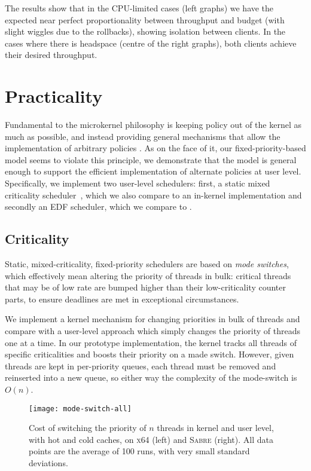 The results show that in the CPU-limited cases (left graphs)
we have the expected near perfect proportionality between throughput and
budget (with slight wiggles due to the rollbacks), showing isolation between clients. In the cases where there is headspace (centre of the right
graphs), both clients achieve their desired throughput.

\section{Practicality}

Fundamental to the microkernel philosophy is keeping policy out of the
kernel as much as possible, and instead providing general mechanisms
that allow the implementation of arbitrary policies
\citep{Heiser_Elphinstone_16}.  As on the face of it, our
fixed-priority-based model seems to violate this principle,  we
demonstrate that the model is general enough to support the efficient
implementation of alternate policies at user level. Specifically, we
implement two user-level schedulers: first, a static mixed criticality
scheduler~\citep{Baruah_BD_11}, which we also compare to an in-kernel
implementation and secondly an \gls{EDF} scheduler, which we compare to \litmus.

\subsection{Criticality}

Static, mixed-criticality, fixed-priority schedulers are based on \emph{mode
switches}, which effectively mean altering the priority of threads in bulk:
critical threads that may be of low rate are bumped higher than their
low-criticality counter parts, to ensure deadlines are met in exceptional
circumstances. 

We implement a kernel mechanism for changing priorities in bulk of threads 
and compare with a user-level approach which simply changes the priority of threads
one at a time. In our prototype implementation, the kernel tracks all threads of specific criticalities and boosts their priority on a made switch. However, given threads are kept in per-priority queues, each thread must be removed and reinserted into a new queue, so either way the complexity of the mode-switch is $O(n)$. 

\begin{figure}
  \centering
  \texttt{[image: mode-switch-all]}
  \caption{Cost of switching the priority of $n$ threads in kernel and user level, with hot
            and cold caches, on \textsc{x64} (left) and \textsc{Sabre} (right). All data points are the average of 100 runs,
                  with very small standard deviations.}
  \label{f:mode-switch}
\end{figure}

